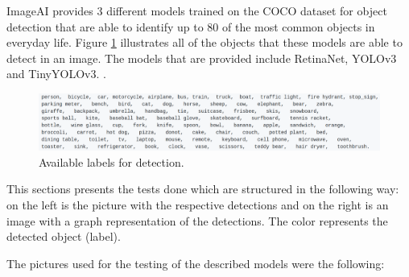   ImageAI provides 3 different models trained on the COCO dataset for object detection that are able to identify up to 80 of the most common objects in everyday life. Figure \ref{fig:labels} illustrates all of the objects that these models are able to detect in an image. The models that are provided include RetinaNet, YOLOv3 and TinyYOLOv3. \cite{ImageAI}.
  

  

    \begin{figure}[H]
      \centering
      \includegraphics[width = \textwidth]{Sections/4InitialWork/4_images_random/detections.png}
      \caption{Available labels for detection. }
      \label{fig:labels} 
  \end{figure}

 This sections presents the tests done which are structured in the following way: on the left is the picture with the respective detections and on the right is an image with a graph representation of the detections. The color represents the detected object (label). 

  The pictures used for the testing of the described models were the following:

